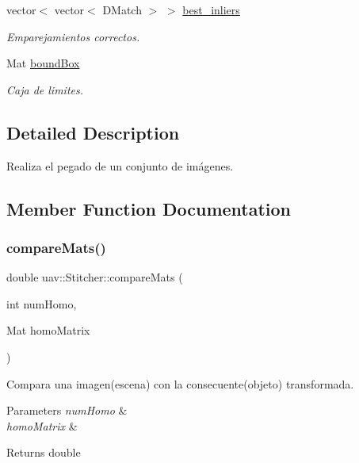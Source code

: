 \begin{DoxyCompactItemize}
vector$<$ vector$<$ D\+Match $>$ $>$ \mbox{\hyperlink{classuav_1_1Stitcher_a3aecc00facecd4f6952594b76cf4ea52}{best\+\_\+inliers}}
\begin{DoxyCompactList}\small\item\em Emparejamientos correctos. \end{DoxyCompactList}\item 
\mbox{\label{classuav_1_1Stitcher_a6f27d69501dd482cf217de22ca57fd13}} 
Mat \mbox{\hyperlink{classuav_1_1Stitcher_a6f27d69501dd482cf217de22ca57fd13}{bound\+Box}}
\begin{DoxyCompactList}\small\item\em Caja de limites. \end{DoxyCompactList}\end{DoxyCompactItemize}


\subsection{Detailed Description}
Realiza el pegado de un conjunto de imágenes. 

\subsection{Member Function Documentation}
\mbox{\label{classuav_1_1Stitcher_a0745fd6db5669c1f9bce1b637c2be163}} 
\subsubsection{\texorpdfstring{compare\+Mats()}{compareMats()}}
{\footnotesize\ttfamily double uav\+::\+Stitcher\+::compare\+Mats (\begin{DoxyParamCaption}\item[{int}]{num\+Homo,  }\item[{Mat}]{homo\+Matrix }\end{DoxyParamCaption})\hspace{0.3cm}{\ttfamily [inline]}}



Compara una imagen(escena) con la consecuente(objeto) transformada. 


\begin{DoxyParams}{Parameters}
{\em num\+Homo} & \\
\hline
{\em homo\+Matrix} & \\
\hline
\end{DoxyParams}
\begin{DoxyReturn}{Returns}
double 
\end{DoxyReturn}
\mbox{\label{classuav_1_1Stitcher_a16bfb7a49f1e3a9c38ef03d72969094d}} 
